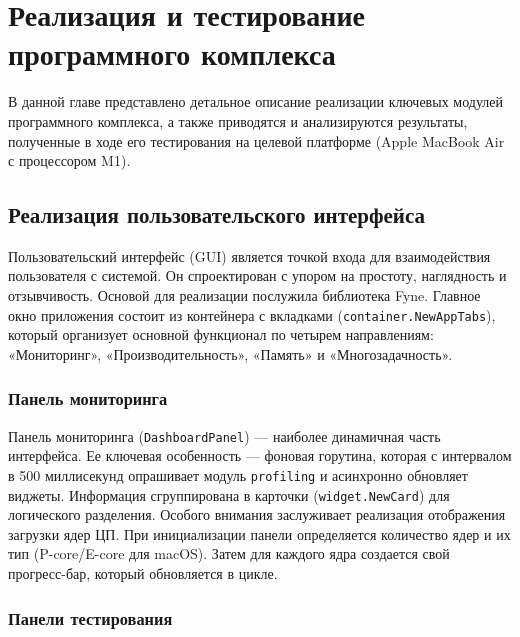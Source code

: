 \section{Реализация и тестирование программного комплекса}

В данной главе представлено детальное описание реализации ключевых модулей программного комплекса, а также приводятся и анализируются результаты, полученные в ходе его тестирования на целевой платформе (Apple MacBook Air с процессором M1).

\subsection{Реализация пользовательского интерфейса}

Пользовательский интерфейс (GUI) является точкой входа для взаимодействия пользователя с системой. Он спроектирован с упором на простоту, наглядность и отзывчивость. Основой для реализации послужила библиотека Fyne. Главное окно приложения состоит из контейнера с вкладками (\texttt{container.NewAppTabs}), который организует основной функционал по четырем направлениям: «Мониторинг», «Производительность», «Память» и «Многозадачность».

\subsubsection{Панель мониторинга}

Панель мониторинга (\texttt{DashboardPanel}) — наиболее динамичная часть интерфейса. Ее ключевая особенность — фоновая горутина, которая с интервалом в 500 миллисекунд опрашивает модуль \texttt{profiling} и асинхронно обновляет виджеты. Информация сгруппирована в карточки (\texttt{widget.NewCard}) для логического разделения. Особого внимания заслуживает реализация отображения загрузки ядер ЦП. При инициализации панели определяется количество ядер и их тип (P-core/E-core для macOS). Затем для каждого ядра создается свой прогресс-бар, который обновляется в цикле.

\subsubsection{Панели тестирования}

